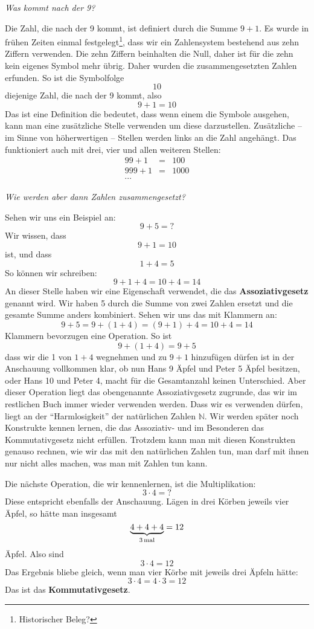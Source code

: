 \textsl{Was kommt nach der 9?}

Die Zahl, die nach der 9 kommt, ist definiert durch die Summe $9+1$. Es wurde in frühen Zeiten einmal festgelegt\footnote{Historischer Beleg?}, dass wir ein Zahlensystem bestehend aus zehn Ziffern verwenden. Die zehn Ziffern beinhalten die Null, daher ist für die zehn kein eigenes Symbol mehr übrig. Daher wurden die zusammengesetzten Zahlen erfunden. So ist die Symbolfolge
\[10\]
diejenige Zahl, die nach der 9 kommt, also
\[9+1=10\]
Das ist eine Definition die bedeutet, dass wenn einem die Symbole ausgehen, kann man eine zusätzliche Stelle verwenden um diese darzustellen. Zusätzliche -- im Sinne von höherwertigen -- Stellen werden links an die Zahl angehängt. Das funktioniert auch mit drei, vier und allen weiteren Stellen:
\begin{eqnarray*}
99+1 &=& 100 \\
999+1 &=& 1000 \\
\cdots
\end{eqnarray*}

\noindent \textsl{Wie werden aber dann Zahlen zusammengesetzt?}

\noindent Sehen wir uns ein Beispiel an:
\[9+5 = ?\]
Wir wissen, dass 
\[9+1 = 10\]
ist, und dass
\[1+4 = 5\]
So können wir schreiben:
\[9+1+4 = 10 + 4 = 14\]
An dieser Stelle haben wir eine Eigenschaft verwendet, die das \textbf{Assoziativgesetz} genannt wird. Wir haben 5 durch die Summe von zwei Zahlen ersetzt und die gesamte Summe anders kombiniert. Sehen wir uns das mit Klammern an:
\[9+5 = 9+(1+4) = (9+1)+4 = 10+4 = 14\]
Klammern bevorzugen eine Operation. So ist
\[9+(1+4)=9+5\]
dass wir die 1 von $1+4$ wegnehmen und zu $9+1$ hinzufügen dürfen ist in der Anschauung vollkommen klar, ob nun Hans 9 Äpfel und Peter 5 Äpfel besitzen, oder Hans 10 und Peter 4, macht für die Gesamtanzahl keinen Unterschied. Aber dieser Operation liegt das obengenannte Assoziativgesetz zugrunde, das wir im restlichen Buch immer wieder verwenden werden. Dass wir es verwenden dürfen, liegt an der "`Harmlosigkeit"' der natürlichen Zahlen $\mathbb{N}$. Wir werden später noch Konstrukte kennen lernen, die das Assoziativ- und im Besonderen das Kommutativgesetz nicht erfüllen. Trotzdem kann man mit diesen Konstrukten genauso rechnen, wie wir das mit den natürlichen Zahlen tun, man darf mit ihnen nur nicht alles machen, was man mit Zahlen tun kann.

Die nächste Operation, die wir kennenlernen, ist die Multiplikation:
\[3\cdot 4 = ?\]
Diese entspricht ebenfalls der Anschauung. Lägen in drei Körben jeweils vier Äpfel, so hätte man insgesamt
\[\underbrace{4+4+4}_{3 \, \textnormal{mal}} = 12\]
Äpfel. Also sind 
\[3\cdot 4 = 12\]
Das Ergebnis bliebe gleich, wenn man vier Körbe mit jeweils drei Äpfeln hätte:
\[3\cdot 4 = 4\cdot 3 = 12\]
Das ist das \textbf{Kommutativgesetz}.

